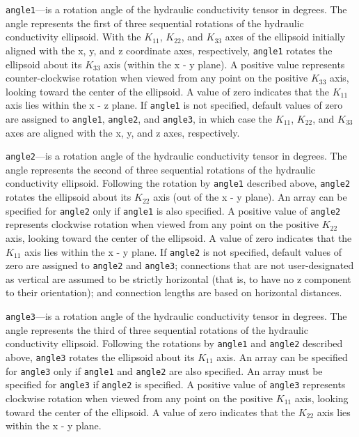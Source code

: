 \begin{description}
\item \texttt{angle1}---is a rotation angle of the hydraulic conductivity tensor in degrees. The angle represents the first of three sequential rotations of the hydraulic conductivity ellipsoid. With the $K_{11}$, $K_{22}$, and $K_{33}$ axes of the ellipsoid initially aligned with the x, y, and z coordinate axes, respectively, \texttt{angle1} rotates the ellipsoid about its $K_{33}$ axis (within the x - y plane). A positive value represents counter-clockwise rotation when viewed from any point on the positive $K_{33}$ axis, looking toward the center of the ellipsoid. A value of zero indicates that the $K_{11}$ axis lies within the x - z plane. If \texttt{angle1} is not specified, default values of zero are assigned to \texttt{angle1}, \texttt{angle2}, and \texttt{angle3}, in which case the $K_{11}$, $K_{22}$, and $K_{33}$ axes are aligned with the x, y, and z axes, respectively.

\item \texttt{angle2}---is a rotation angle of the hydraulic conductivity tensor in degrees. The angle represents the second of three sequential rotations of the hydraulic conductivity ellipsoid. Following the rotation by \texttt{angle1} described above, \texttt{angle2} rotates the ellipsoid about its $K_{22}$ axis (out of the x - y plane). An array can be specified for \texttt{angle2} only if \texttt{angle1} is also specified. A positive value of \texttt{angle2} represents clockwise rotation when viewed from any point on the positive $K_{22}$ axis, looking toward the center of the ellipsoid. A value of zero indicates that the $K_{11}$ axis lies within the x - y plane. If \texttt{angle2} is not specified, default values of zero are assigned to \texttt{angle2} and \texttt{angle3}; connections that are not user-designated as vertical are assumed to be strictly horizontal (that is, to have no z component to their orientation); and connection lengths are based on horizontal distances.

\item \texttt{angle3}---is a rotation angle of the hydraulic conductivity tensor in degrees. The angle represents the third of three sequential rotations of the hydraulic conductivity ellipsoid. Following the rotations by \texttt{angle1} and \texttt{angle2} described above, \texttt{angle3} rotates the ellipsoid about its $K_{11}$ axis. An array can be specified for \texttt{angle3} only if \texttt{angle1} and \texttt{angle2} are also specified. An array must be specified for \texttt{angle3} if \texttt{angle2} is specified. A positive value of \texttt{angle3} represents clockwise rotation when viewed from any point on the positive $K_{11}$ axis, looking toward the center of the ellipsoid. A value of zero indicates that the $K_{22}$ axis lies within the x - y plane.


\end{description}
